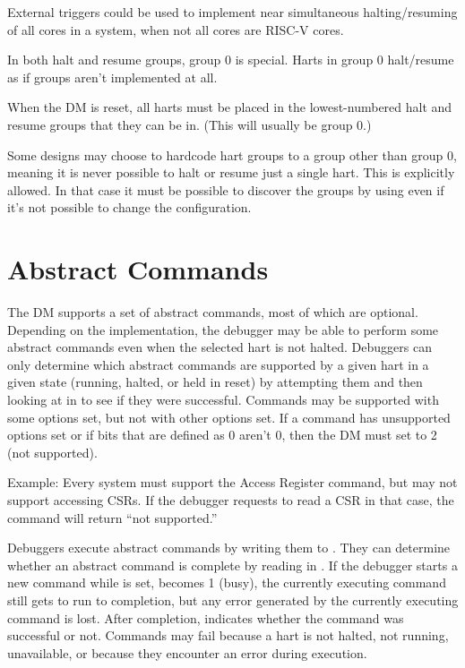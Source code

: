 \begin{commentary}
    External triggers could be used to implement near simultaneous
    halting/resuming of all cores in a system, when not all cores are RISC-V
    cores.
\end{commentary}

In both halt and resume groups, group 0 is special. Harts in group 0
halt/resume as if groups aren't implemented at all.

When the DM is reset, all harts must be placed in the lowest-numbered halt and
resume groups that they can be in. (This will usually be group 0.)

Some designs may choose to hardcode hart groups to a group other than group 0,
meaning it is never possible to halt or resume just a single hart. This is
explicitly allowed. In that case it must be possible to discover the groups by
using \RdmDmcsTwo even if it's not possible to change the configuration.

\section{Abstract Commands} \label{abstractcommands}

The DM supports a set of abstract commands, most of which
are optional. Depending on the implementation, the debugger may
be able to perform
some abstract commands even when the selected hart is not halted.
Debuggers can only determine which abstract commands
are supported by a given hart in a given state (running, halted, or held in reset) by attempting them
and then looking at \FdmAbstractcsCmderr in \RdmAbstractcs to see if they were successful.
Commands may be supported with some options set, but not with other options
set. If a command has unsupported options set or if bits that are defined as 0
aren't 0, then the DM must set \FdmAbstractcsCmderr to 2 (not supported).

\begin{commentary}
    Example: Every system must support the Access Register command, but may not
    support accessing CSRs. If the debugger requests to read a CSR in that
    case, the command will return ``not supported.''
\end{commentary}

Debuggers execute abstract commands by writing them to \RdmCommand.  They
can determine whether an abstract command is complete by reading \FdmAbstractcsBusy in
\RdmAbstractcs. If the debugger starts a new command while \FdmAbstractcsBusy is set,
\FdmAbstractcsCmderr becomes 1 (busy), the currently executing command still gets to
run to completion, but any error generated by the currently executing command is lost.
After completion, \FdmAbstractcsCmderr indicates whether the command was
successful or not. Commands may fail because a hart is not halted, not running,
unavailable, or because they encounter an error during execution.

